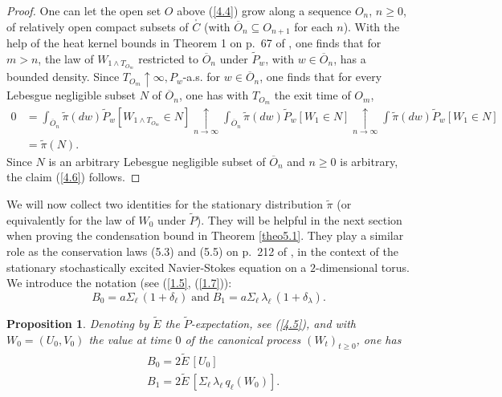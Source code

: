 \documentclass[12pt,leqno]{article}
\def\n{\noindent}
\def\dis{\displaystyle}
\def\ov{\overline}
\def\r{\rightarrow}
\def\wt{\widetilde}
\newtheorem{proposition}[theorem]{Proposition}
\begin{document}
\begin{proof}
One can let the open set $O$ above (\ref{4.4}) grow along a sequence $O_n$, $n \ge 0$, of relatively open compact subsets of $\stackrel{_\circ}{C}$ (with $\ov{O}_n \subseteq O_{n+1}$ for each $n$). With the help of the heat kernel bounds in Theorem 1 on p.~67 of  \cite{IlinKalaOlei62}, one finds that for $m > n$, the law of $W_{1 \wedge T_{O_m}}$ restricted to $\ov{O}_n$ under $\wt{P}_w$, with $w \in \ov{O}_n$, has a bounded density. Since $T_{O_m} \uparrow \infty, P_w$-a.s. for $w \in \ov{O}_n$, one finds that for every Lebesgue negligible subset $N$ of $\ov{O}_n$, one has with $T_{O_m}$ the exit time of $O_m$,
\begin{equation}\label{4.7}
\begin{split}
0  &= \dis\int_{\ov{O}_n} \!\wt{\pi} (dw)  \wt{P}_w [ W_{1 \wedge T_{O_m}} \!\in \!N] \underset{n \r \infty}{\uparrow} \dis\int_{\ov{O}_n} \!\wt{\pi}(dw)  \wt{P}_w [W_1\!\in \!N] \underset{n \r \infty}{\uparrow} 
\dis\int \!\wt{\pi} (dw)  \wt{P}_w [W_1\!\in\!N]
\\[1ex]
&= \wt{\pi}(N).
\end{split}
\end{equation}
Since $N$ is an arbitrary Lebesgue negligible subset of $\ov{O}_n$ and $n \ge 0$ is arbitrary, the claim (\ref{4.6}) follows.
\end{proof}

\n
We will now collect two identities for the stationary distribution $\wt{\pi}$ (or equivalently for the law of $W_0$ under $\wt{P}$). They will be helpful in the next section when proving the condensation bound in Theorem \ref{theo5.1}. They play a similar role as the conservation laws (5.3) and (5.5) on p.~212 of \cite{KuksShir12}, in the context of the stationary stochastically excited Navier-Stokes equation on a $2$-dimensional torus. We introduce the notation (see (\ref{1.5}, (\ref{1.7})):
\begin{equation}\label{4.8}
B_0 = a \Sigma_\ell \,(1 + \delta_\ell) \; \mbox{and} \; B_1 = a \Sigma_\ell \, \lambda_\ell \,(1 + \delta_\lambda).
\end{equation}

\begin{proposition}\label{prop4.4}
Denoting by $\wt{E}$ the $\wt{P}$-expectation, see {\rm (\ref{4.5})}, and with $W_0 = (U_0,V_0)$ the value at time $0$ of the canonical process $(W_t)_{t \ge 0}$, one has
\begin{align}
& B_0 = 2 \wt{E}\, [U_0] \label{4.9}
\\[1ex]
&B_1 = 2 \wt{E}\, [\Sigma_\ell \,\lambda_\ell \, q_\ell(W_0)]. \label{4.10}
\end{align}
\end{proposition}
\end{document}
